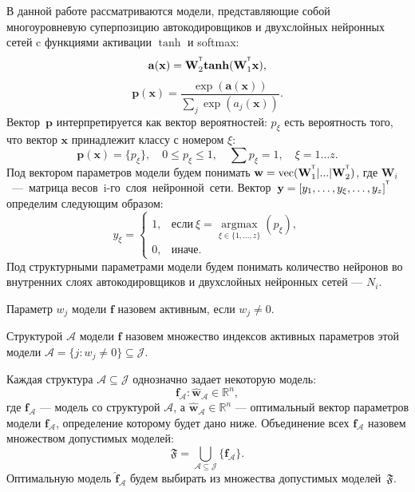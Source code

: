 \documentclass[12pt]{article}
\begin{document}
В данной работе  рассматриваются модели, представляющие собой многоуровневую суперпозицию автокодировщиков и двухслойных нейронных сетей c функциями активации $\tanh$  и softmax:
\begin{equation*}
\mathbf{a(\mathbf{x})} = \mathbf{W}_2^{^{\text{\tiny\sffamily\upshape\mdseries T}}}\mathbf{tanh}(\mathbf{W}_1^{^{\text{\tiny\sffamily\upshape\mdseries T}}}\mathbf{x}),
\end{equation*}
\begin{equation*}
\mathbf{p(\mathbf{x})} = \frac {\exp(\mathbf{a(\mathbf{x})})}{\sum_j \exp(a_j(\mathbf{x}))}.
\end{equation*}
Вектор~$\mathbf{p}$ интерпретируется как вектор вероятностей: $p_{\xi}$ есть вероятность того, что вектор $\mathbf{x}$ принадлежит классу с номером ${\xi}$:
\begin{equation*}
\mathbf{p(\mathbf{x})} = \{p_\xi\},\quad 0 \leq p_{\xi} \leq 1,\quad \sum p_{\xi} = 1, \quad {\xi} = 1\dots z.
\end{equation*}
Под вектором параметров модели будем понимать  $\mathbf{w} = \text{vec}(\mathbf{W}_1^{^{\text{\tiny\sffamily\upshape\mdseries T}}}|...|\mathbf{W}_2^{^{\text{\tiny\sffamily\upshape\mdseries T}}})$, где $\mathbf{W}_i$~---~матрица весов~i-го~слоя~нейронной~сети. Вектор~$\mathbf{y}=[y_1,\dots,y_{\xi},\dots,y_z]^{^{\text{\tiny\sffamily\upshape\mdseries T}}}$ определим следующим образом:
\begin{equation*}
y_{\xi} = \begin{cases}
1, & \mbox{если}~{\xi} = \mathop{\text{argmax}}\limits_{\xi \in \{1,\dots,z\}} (p_{\xi}),  \\
0, & \mbox{иначе}.
\end{cases}
\end{equation*}
Под структурными параметрами модели будем понимать количество нейронов во внутренних слоях автокодировщиков и двухслойных нейронных сетей --- $N_i$.
\begin{Def}
Параметр $w_j$ модели $\mathbf{f}$ назовем активным, если $w_j \neq 0$.
\end{Def}
\begin{Def}
Структурой $\mathcal{A}$ модели $\mathbf{f}$ назовем множество индексов активных параметров этой модели $\mathcal{A} = \{j: w_j \neq 0 \} \subseteq \mathcal{J}$.
\end{Def}
Каждая структура $\mathcal{A} \subseteq \mathcal{J}$ однозначно задает некоторую модель:
\begin{equation*}
\mathbf{f}_{\mathcal{A}} : \mathbf{\hat{w}}_{\mathcal{A}} \in \mathbb{R}^n,
\end{equation*}
где $\mathbf{f}_{\mathcal{A}}$ --- модель со структурой $\mathcal{A}$, а $\mathbf{\hat{w}}_{\mathcal{A}} \in \mathbb{R}^n$ --- оптимальный вектор параметров модели $\mathbf{f}_{\mathcal{A}}$, определение которому будет дано ниже. Объединение всех $\mathbf{f}_\mathcal{A}$ назовем множеством допустимых моделей:
\begin{equation}
\label{eq:2}
\mathfrak{F} = \bigcup\limits_{{\mathcal{A} \subseteq \mathcal{J}}}\{\mathbf{f}_\mathcal{A}\}.
\end{equation}
Оптимальную модель $\mathbf{\hat{f}}_{\mathcal{A}}$ будем выбирать из множества допустимых моделей~$\mathfrak{F}$.
\end{document}
